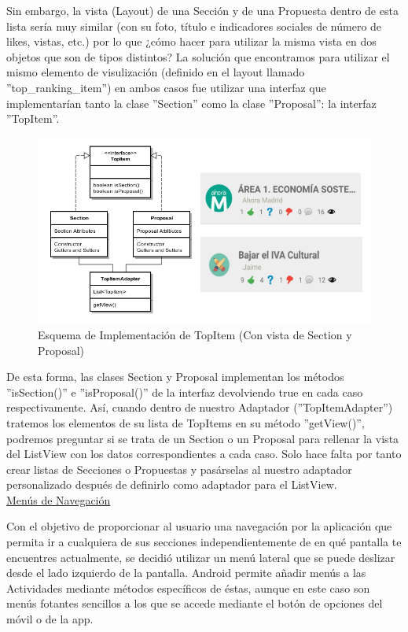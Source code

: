 		Sin embargo, la vista (Layout) de una Sección y de una Propuesta dentro de esta lista sería muy similar (con su foto, título e indicadores sociales de número de likes, vistas, etc.) por lo que ¿cómo hacer para utilizar la misma vista en dos objetos que son de tipos distintos? La solución que encontramos para utilizar el mismo elemento de visulización (definido en el layout llamado ''top\_ranking\_item'') en ambos casos fue utilizar una interfaz que implementarían tanto la clase  ''Section'' como la clase ''Proposal'': la interfaz ''TopItem''.
		
	\begin{figure}[H]
	  \centering
	    \includegraphics[keepaspectratio, scale=0.6]{Media/Diagrams/classDiagramTopItemAdapter.png}
	  \caption{Esquema de Implementación de TopItem (Con vista de Section y Proposal)}
	  \label{fig:topItemArch}
	\end{figure}
	
	De esta forma, las clases Section y Proposal implementan los métodos ''isSection()'' e ''isProposal()'' de la interfaz devolviendo true en cada caso respectivamente. Así, cuando dentro de nuestro Adaptador (''TopItemAdapter'') tratemos los elementos de su lista de TopItems en su método ''getView()'', podremos preguntar si se trata de un Section o un Proposal para rellenar la vista del ListView con los datos correspondientes a cada caso. Solo hace falta por tanto crear listas de Secciones o Propuestas y pasárselas al nuestro adaptador personalizado después de definirlo como adaptador para el ListView. \\
		
		\underline{Menús de Navegación}
		
		Con el objetivo de proporcionar al usuario una navegación por la aplicación que permita ir a cualquiera de sus secciones independientemente de en qué pantalla te encuentres actualmente, se decidió utilizar un menú lateral que se puede deslizar desde el lado izquierdo de la pantalla. Android permite añadir menús \cite{ref:android_menu} a las Actividades mediante métodos específicos de éstas, aunque en este caso son menús fotantes sencillos a los que se accede mediante el botón de opciones del móvil o de la app. 
		
